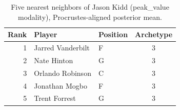 \begin{table}[htbp]
  \centering\small
  \begin{tabular}{rllc}
    \toprule
    Rank & Player & Position & Archetype \\
    \midrule
    1 & Jarred Vanderbilt & F & 3 \\
    2 & Nate Hinton & G & 3 \\
    3 & Orlando Robinson & C & 3 \\
    4 & Jonathan Mogbo & F & 3 \\
    5 & Trent Forrest & G & 3 \\
    \bottomrule
  \end{tabular}
  \caption{Five nearest neighbors of Jason Kidd (peak_value modality), Procrustes-aligned posterior mean.}
  \label{tab:Jason_Kidd_neighbors_peak_value}
\end{table}

